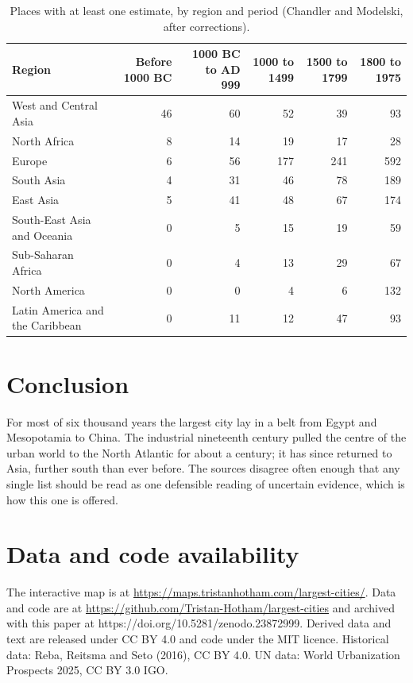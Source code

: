 \documentclass[11pt,a4paper]{article}
\begin{document}
\begin{table}[tbp]\centering\footnotesize\setlength{\tabcolsep}{4pt}\caption{Places with at least one estimate, by region and period (Chandler and Modelski, after corrections).}\label{tab:cov}\begin{tabular}{lrrrrr}\toprule Region & Before 1000 BC & 1000 BC to AD 999 & 1000 to 1499 & 1500 to 1799 & 1800 to 1975\\\midrule
West and Central Asia & 46 & 60 & 52 & 39 & 93\\
North Africa & 8 & 14 & 19 & 17 & 28\\
Europe & 6 & 56 & 177 & 241 & 592\\
South Asia & 4 & 31 & 46 & 78 & 189\\
East Asia & 5 & 41 & 48 & 67 & 174\\
South-East Asia and Oceania & 0 & 5 & 15 & 19 & 59\\
Sub-Saharan Africa & 0 & 4 & 13 & 29 & 67\\
North America & 0 & 0 & 4 & 6 & 132\\
Latin America and the Caribbean & 0 & 11 & 12 & 47 & 93\\
\bottomrule\end{tabular}\end{table}

\section{Conclusion}
For most of six thousand years the largest city lay in a belt from Egypt and Mesopotamia to China. The industrial nineteenth century pulled the centre of the urban world to the North Atlantic for about a century; it has since returned to Asia, further south than ever before. The sources disagree often enough that any single list should be read as one defensible reading of uncertain evidence, which is how this one is offered.

\section*{Data and code availability}
The interactive map is at \url{https://maps.tristanhotham.com/largest-cities/}. Data and code are at \url{https://github.com/Tristan-Hotham/largest-cities} and archived with this paper at https://doi.org/10.5281/zenodo.23872999. Derived data and text are released under CC BY 4.0 and code under the MIT licence. Historical data: Reba, Reitsma and Seto (2016), CC BY 4.0. UN data: World Urbanization Prospects 2025, CC BY 3.0 IGO.
\end{document}
